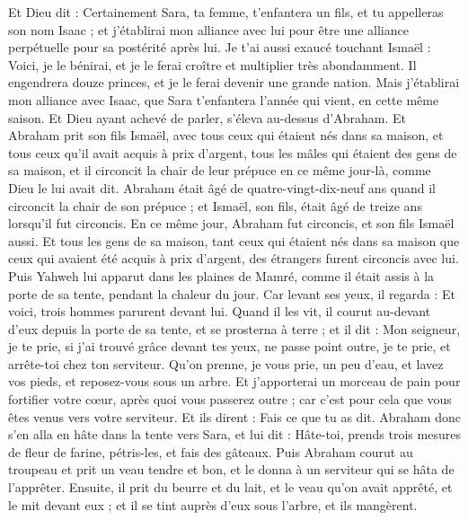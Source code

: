 \begin{multicols}{2}
Et Dieu dit : Certainement Sara, ta femme, t'enfantera un fils, et tu appelleras son nom Isaac ; et j'établirai mon alliance avec lui pour être une alliance perpétuelle pour sa postérité après lui.
Je t'ai aussi exaucé touchant Ismaël : Voici, je le bénirai, et je le ferai croître et multiplier très abondamment. Il engendrera douze princes, et je le ferai devenir une grande nation.
Mais j'établirai mon alliance avec Isaac, que Sara t'enfantera l'année qui vient, en cette même saison.
Et Dieu ayant achevé de parler, s'éleva au-dessus d'Abraham.
Et Abraham prit son fils Ismaël, avec tous ceux qui étaient nés dans sa maison, et tous ceux qu'il avait acquis à prix d'argent, tous les mâles qui étaient des gens de sa maison, et il circoncit la chair de leur prépuce en ce même jour-là, comme Dieu le lui avait dit.
Abraham était âgé de quatre-vingt-dix-neuf ans quand il circoncit la chair de son prépuce ;
et Ismaël, son fils, était âgé de treize ans lorsqu'il fut circoncis.
En ce même jour, Abraham fut circoncis, et son fils Ismaël aussi.
Et tous les gens de sa maison, tant ceux qui étaient nés dans sa maison que ceux qui avaient été acquis à prix d'argent, des étrangers furent circoncis avec lui.
\VerseOne{}Puis Yahweh lui apparut dans les plaines de Mamré, comme il était assis à la porte de sa tente, pendant la chaleur du jour.
Car levant ses yeux, il regarda : Et voici, trois hommes parurent devant lui. Quand il les vit, il courut au-devant d'eux depuis la porte de sa tente, et se prosterna à terre ;
et il dit : Mon seigneur, je te prie, si j'ai trouvé grâce devant tes yeux, ne passe point outre, je te prie, et arrête-toi chez ton serviteur.
Qu'on prenne, je vous prie, un peu d'eau, et lavez vos pieds, et reposez-vous sous un arbre.
Et j'apporterai un morceau de pain pour fortifier votre cœur, après quoi vous passerez outre ; car c'est pour cela que vous êtes venus vers votre serviteur. Et ils dirent : Fais ce que tu as dit.
Abraham donc s'en alla en hâte dans la tente vers Sara, et lui dit : Hâte-toi, prends trois mesures de fleur de farine, pétris-les, et fais des gâteaux.
Puis Abraham courut au troupeau et prit un veau tendre et bon, et le donna à un serviteur qui se hâta de l'apprêter.
Ensuite, il prit du beurre et du lait, et le veau qu'on avait apprêté, et le mit devant eux ; et il se tint auprès d'eux sous l'arbre, et ils mangèrent.

\end{multicols}
